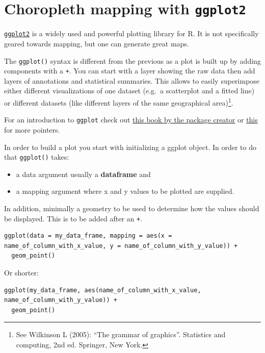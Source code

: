 \documentclass[]{book}
\providecommand{\tightlist}{%
  \setlength{\itemsep}{0pt}\setlength{\parskip}{0pt}}
\let\rmarkdownfootnote\footnote%
\def\footnote{\protect\rmarkdownfootnote}
\begin{document}
\section{\texorpdfstring{Choropleth mapping with
\texttt{ggplot2}}{Choropleth mapping with ggplot2}}\label{choropleth-mapping-with-ggplot2}

\href{http://ggplot2.org/}{\texttt{ggplot2}} is a widely used and
powerful plotting library for R. It is not specifically geared towards
mapping, but one can generate great maps.

The \texttt{ggplot()} syntax is different from the previous as a plot is
built up by adding components with a \texttt{+}. You can start with a
layer showing the raw data then add layers of annotations and
statistical summaries. This allows to easily superimpose either
different visualizations of one dataset (e.g.~a scatterplot and a fitted
line) or different datasets (like different layers of the same
geographical area)\footnote{See Wilkinson L (2005): ``The grammar of
  graphics''. Statistics and computing, 2nd ed. Springer, New York.}.

For an introduction to \texttt{ggplot} check out
\href{http://link.springer.com/book/10.1007\%2F978-3-319-24277-4}{this
book by the package creator} or
\href{http://ggplot2.tidyverse.org/}{this} for more pointers.

In order to build a plot you start with initializing a ggplot object. In
order to do that \texttt{ggplot()} takes:

\begin{itemize}
\tightlist
\item
  a data argument usually a \textbf{dataframe} and
\item
  a mapping argument where x and y values to be plotted are supplied.
\end{itemize}

In addition, minimally a geometry to be used to determine how the values
should be displayed. This is to be added after an \texttt{+}.

\begin{verbatim}
ggplot(data = my_data_frame, mapping = aes(x = name_of_column_with_x_value, y = name_of_column_with_y_value)) +
  geom_point()
\end{verbatim}

Or shorter:

\begin{verbatim}
ggplot(my_data_frame, aes(name_of_column_with_x_value, name_of_column_with_y_value)) +
  geom_point()
\end{verbatim}
\end{document}
